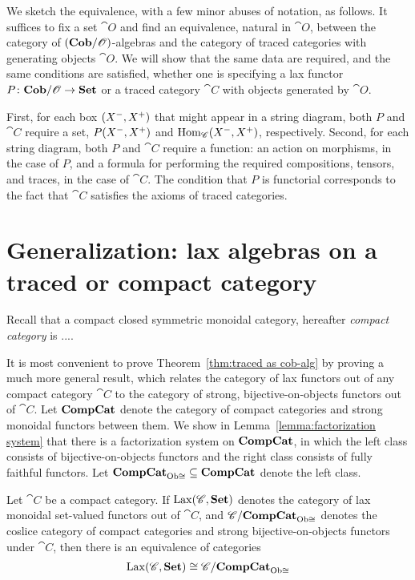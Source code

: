 \documentclass[12pt,oneside,article,draft]{memoir}
\begin{document}
We sketch the equivalence, with a few minor abuses of notation, as follows. It suffices to fix a set $\cat{O}$ and find an equivalence, natural in $\cat{O}$, between the category of $(\mathbf{Cob}/\mathscr{O})$-algebras and the category of traced categories with  generating objects $\cat{O}$. We will show that the same data are required, and the same conditions are satisfied, whether one is specifying a lax functor $P\colon\mathbf{Cob}/\mathscr{O}\to\mathbf{Set}$ or a traced category $\cat{C}$ with objects generated by $\cat{O}$. 

First, for each box $(X^-,X^+)$ that might appear in a string diagram, both $P$ and $\cat{C}$ require a set, $P(X^-,X^+)$ and $\operatorname{Hom}_{\mathscr{C}}(X^-,X^+)$, respectively. Second, for each string diagram, both $P$ and $\cat{C}$ require a function: an action on morphisms, in the case of $P$, and a formula for performing the required compositions, tensors, and traces, in the case of $\cat{C}$. The condition that $P$ is functorial corresponds to the fact that $\cat{C}$ satisfies the axioms of traced categories.

\section{Generalization: lax algebras on a traced or compact category}

Recall that a compact closed symmetric monoidal category, hereafter \emph{compact category} is .... 

It is most convenient to prove Theorem~\ref{thm:traced as cob-alg} by proving a much more general result, which relates the category of lax functors out of any compact category $\cat{C}$ to the category of strong, bijective-on-objects functors out of $\cat{C}$. Let $\mathbf{CompCat}$ denote the category of compact categories and strong monoidal functors between them. We show in Lemma~\ref{lemma:factorization system} that there is a factorization system on $\mathbf{CompCat}$, in which the left class consists of bijective-on-objects functors and the right class consists of fully faithful functors. Let $\mathbf{CompCat}_{{\operatorname{Ob}\cong}}\subseteq\mathbf{CompCat}$ denote the left class. 

\begin{theorem}\label{thm:compact lax and strong}
 Let $\cat{C}$ be a compact category. If $\operatorname{Lax}(\mathscr{C},\mathbf{Set})$ denotes the category of lax monoidal set-valued functors out of $\cat{C}$, and $\mathscr{C}/\mathbf{CompCat}_{{\operatorname{Ob}\cong}}$ denotes the coslice category of compact categories and strong bijective-on-objects functors under $\cat{C}$, then there is an equivalence of categories
\begin{align}\label{dia:compact lax strong}
\operatorname{Lax}(\mathscr{C},\mathbf{Set})\cong\mathscr{C}/\mathbf{CompCat}_{{\operatorname{Ob}\cong}}
\end{align}
\end{theorem}
\end{document}
